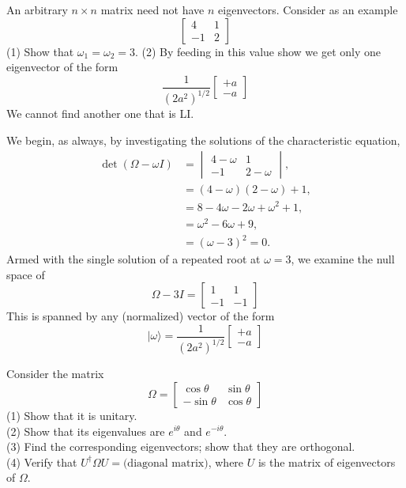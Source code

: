 \documentclass[../principles-of-quantum-mechanics.tex]{subfiles}
\begin{document}
\begin{questions}
\question An arbitrary $n\times{n}$ matrix need not have $n$ eigenvectors. Consider as an example
\[
\begin{bmatrix}4 & 1 \\ -1 & 2\end{bmatrix}
\]
(1) Show that $\omega_1=\omega_2=3$.
(2) By feeding in this value show we get only one eigenvector of the form
\[
	\frac{1}{(2a^2)^{1/2}}\begin{bmatrix}+a \\ -a\end{bmatrix}
\]
We cannot find another one that is LI.

\begin{solution}
	We begin, as always, by investigating the solutions of the characteristic equation,
	\begin{align*}
		\det(\Omega - \omega{I}) &= \begin{vmatrix}4 - \omega & 1 \\ -1 & 2 - \omega\end{vmatrix}, \\
		&= (4-\omega)(2-\omega) + 1, \\
		&= 8 - 4\omega - 2\omega + \omega^2 + 1, \\
		&= \omega^2 - 6\omega + 9, \\
		&= (\omega-3)^2 = 0.
	\end{align*}
	Armed with the single solution of a repeated root at $\omega=3$, we examine the null space of
	\[
		\Omega - 3I = \begin{bmatrix}1 & 1 \\ -1 & -1\end{bmatrix}
	\]
	This is spanned by any (normalized) vector of the form
	\[
		|\omega\rangle = \frac{1}{(2a^2)^{1/2}}\begin{bmatrix}+a \\ -a\end{bmatrix}
	\]
\end{solution}

\question Consider the matrix
\[
	\Omega = \begin{bmatrix}\cos\theta & \sin\theta \\ -\sin\theta & \cos\theta \end{bmatrix}
\]
(1) Show that it is unitary. \\
(2) Show that its eigenvalues are $e^{i\theta}$ and $e^{-i\theta}$. \\
(3) Find the corresponding eigenvectors; show that they are orthogonal. \\
(4) Verify that $U^\dagger\Omega{U}=\text{(diagonal matrix)}$, where $U$ is the matrix of eigenvectors of $\Omega$.


\end{questions}
\end{document}
